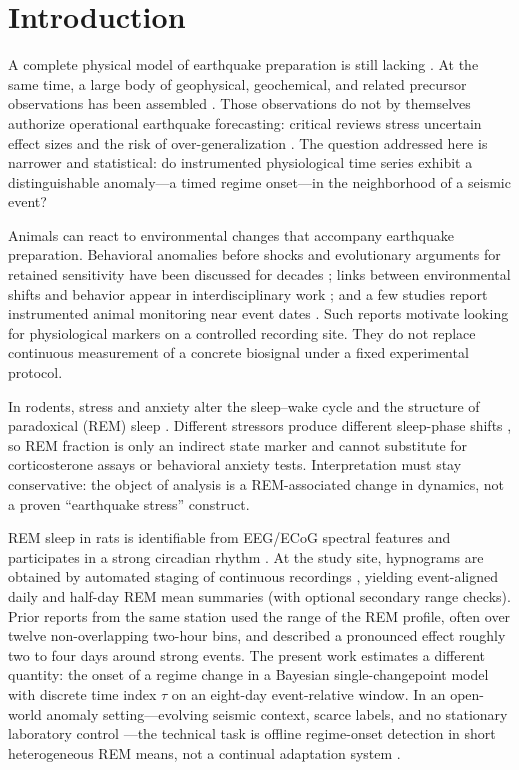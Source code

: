 \section{Introduction}

A complete physical model of earthquake preparation is still lacking \cite{Rodkin2011}. At the same time, a large body of geophysical, geochemical, and related precursor observations has been assembled \cite{Cicerone2009,Conti2021}. Those observations do not by themselves authorize operational earthquake forecasting: critical reviews stress uncertain effect sizes and the risk of over-generalization \cite{Geller1997,Conti2021}. The question addressed here is narrower and statistical: do instrumented physiological time series exhibit a distinguishable anomaly—a timed regime onset—in the neighborhood of a seismic event?

Animals can react to environmental changes that accompany earthquake preparation. Behavioral anomalies before shocks and evolutionary arguments for retained sensitivity have been discussed for decades \cite{Kirschvink2000}; links between environmental shifts and behavior appear in interdisciplinary work \cite{Grant2011}; and a few studies report instrumented animal monitoring near event dates \cite{Yokoi2003}. Such reports motivate looking for physiological markers on a controlled recording site. They do not replace continuous measurement of a concrete biosignal under a fixed experimental protocol.

In rodents, stress and anxiety alter the sleep–wake cycle and the structure of paradoxical (REM) sleep \cite{Rampin1991,Meerlo1997,Palma2000,Sanford2003}. Different stressors produce different sleep-phase shifts \cite{Rampin1991,Meerlo1997,Palma2000}, so REM fraction is only an indirect state marker and cannot substitute for corticosterone assays or behavioral anxiety tests. Interpretation must stay conservative: the object of analysis is a REM-associated change in dynamics, not a proven “earthquake stress” construct.

REM sleep in rats is identifiable from EEG/ECoG spectral features and participates in a strong circadian rhythm \cite{Fang2010,Vyazovskiy2005}. At the study site, hypnograms are obtained by automated staging of continuous recordings \cite{Saevskiy2025}, yielding event-aligned daily and half-day REM mean summaries (with optional secondary range checks). Prior reports from the same station used the range of the REM profile, often over twelve non-overlapping two-hour bins, and described a pronounced effect roughly two to four days around strong events. The present work estimates a different quantity: the onset of a regime change in a Bayesian single-changepoint model with discrete time index \(\tau\) on an eight-day event-relative window. In an open-world anomaly setting---evolving seismic context, scarce labels, and no stationary laboratory control \cite{Chandola2009,Gama2014,Han2023}---the technical task is offline regime-onset detection in short heterogeneous REM means, not a continual adaptation system \cite{Faber2024}.

